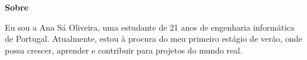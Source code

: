 \noindent\textbf{Sobre}
\noindent\hrulefill
\vspace{0.25em}
\begin{adjustwidth}{1.5em}{0em}
Eu sou a Ana Sá Oliveira, uma estudante de 21 anos
de engenharia informática de Portugal.
Atualmente, estou à procura do meu primeiro estágio de verão,
onde possa crescer, aprender e contribuir para projetos do mundo real.
\end{adjustwidth}
\vspace{0.25em}